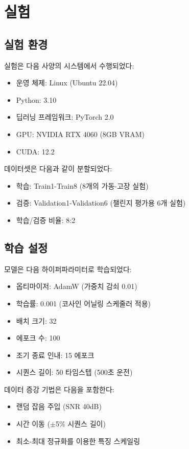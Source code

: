 \documentclass[conference,twocolumn]{IEEEtran}
\begin{document}
\section{실험}

\subsection{실험 환경}

실험은 다음 사양의 시스템에서 수행되었다:
\begin{itemize}
    \item 운영 체제: Linux (Ubuntu 22.04)
    \item Python: 3.10
    \item 딥러닝 프레임워크: PyTorch 2.0
    \item GPU: NVIDIA RTX 4060 (8GB VRAM)
    \item CUDA: 12.2
\end{itemize}

데이터셋은 다음과 같이 분할되었다:
\begin{itemize}
    \item 학습: Train1-Train8 (8개의 가동-고장 실험)
    \item 검증: Validation1-Validation6 (챌린지 평가용 6개 실험)
    \item 학습/검증 비율: 8:2
\end{itemize}

\subsection{학습 설정}

모델은 다음 하이퍼파라미터로 학습되었다:
\begin{itemize}
    \item 옵티마이저: AdamW (가중치 감쇠 0.01)
    \item 학습률: 0.001 (코사인 어닐링 스케줄러 적용)
    \item 배치 크기: 32
    \item 에포크 수: 100
    \item 조기 종료 인내: 15 에포크
    \item 시퀀스 길이: 50 타임스텝 (500초 운전)
\end{itemize}

데이터 증강 기법은 다음을 포함한다:
\begin{itemize}
    \item 랜덤 잡음 주입 (SNR 40dB)
    \item 시간 이동 ($\pm$5\% 시퀀스 길이)
    \item 최소-최대 정규화를 이용한 특징 스케일링
\end{itemize}
\end{document}

